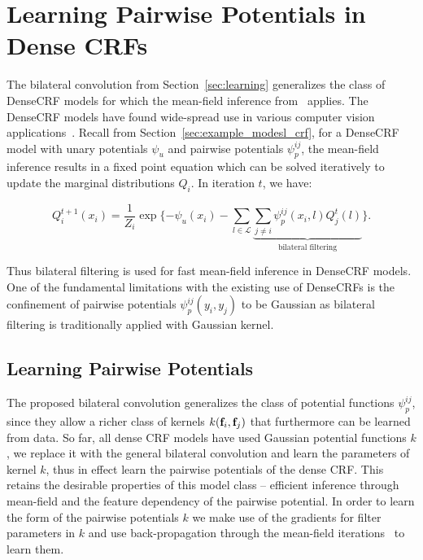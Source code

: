 \section{Learning Pairwise Potentials in Dense CRFs}\label{sec:densecrf}
The bilateral convolution from Section~\ref{sec:learning} generalizes
the class of DenseCRF models for which the mean-field inference from~\cite{krahenbuhl2012efficient}
applies. The DenseCRF models have found wide-spread use in various
computer vision applications~\cite{sun2013fully, bell2014intrinsic, zheng2015conditional, vineet12eccv, vineet12emmcvpr, bell2015minc}. Recall from Section~\ref{sec:example_modesl_crf},
for a DenseCRF model with unary potentials $\psi_u$ and pairwise potentials $\psi^{ij}_p$,
the mean-field inference results in a fixed point equation which
can be solved iteratively to update the marginal distributions $Q_i$. In iteration $t$, we have:

\begin{equation}
Q^{t+1}_i(x_i) = \frac{1}{Z_i} \exp\{-\psi_u(x_i) - \sum_{l \in \mathcal{L}}\underbrace{\sum_{j \ne i}
\psi^{ij}_p(x_i,l) Q^{t}_j(l)}_\text{bilateral filtering}\}.
\label{eq:mfupdate-2}
\end{equation}

Thus bilateral filtering is used for fast mean-field inference in DenseCRF models.
One of the fundamental limitations with the existing use of DenseCRFs is the
confinement of pairwise potentials $\psi^{ij}_p(y_i,y_j)$ to be Gaussian as
bilateral filtering is traditionally applied with Gaussian kernel.

\subsection{Learning Pairwise Potentials}

The proposed bilateral convolution generalizes the class of potential functions $\psi^{ij}_p$, since
they allow a richer class of kernels $k(\mathbf{f}_i,\mathbf{f}_j)$ that furthermore can be learned from data. So far, all
dense CRF models have used Gaussian potential functions $k$, we replace it with the
general bilateral convolution and learn the parameters of kernel $k$, thus in effect
learn the pairwise potentials of the dense CRF. This retains the desirable properties of this
model class -- efficient inference through mean-field and the feature dependency of the pairwise
potential.
In order to learn the form of the pairwise potentials $k$ we make use of the
gradients for filter parameters in $k$ and
use back-propagation through the mean-field iterations~\cite{domke2013learning, li2014mean} to learn them.

